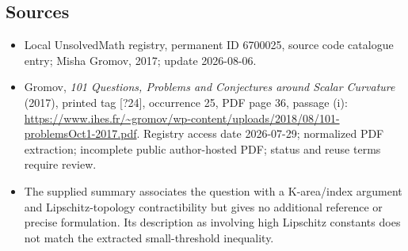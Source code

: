 \documentclass[11pt]{article}
\begin{document}
\subsection{Sources}
\begin{itemize}
\item Local UnsolvedMath registry, permanent ID 6700025, source code catalogue entry; Misha Gromov, 2017; update 2026-08-06.
\item Gromov, \emph{101 Questions, Problems and Conjectures around Scalar Curvature} (2017), printed tag [?24], occurrence 25, PDF page 36, passage (i): \url{https://www.ihes.fr/~gromov/wp-content/uploads/2018/08/101-problemsOct1-2017.pdf}. Registry access date 2026-07-29; normalized PDF extraction; incomplete public author-hosted PDF; status and reuse terms require review.
\item The supplied summary associates the question with a K-area/index argument and Lipschitz-topology contractibility but gives no additional reference or precise formulation. Its description as involving high Lipschitz constants does not match the extracted small-threshold inequality.
\end{itemize}
\end{document}
